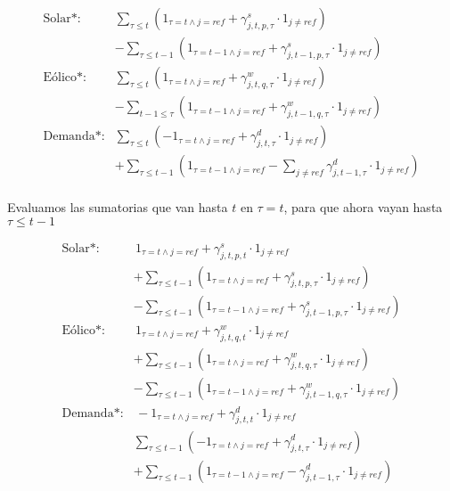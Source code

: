 \begin{align*}
    \text{Solar*:} & \sum_{\tau \leqslant  t} \left ( 1_{\tau = t \wedge j = ref} + \gamma^{s}_{j, t, p, \tau}\cdot 1_{j\neq{ref}} \right ) \\
    & - \sum_{\tau \leqslant  t-1} \left ( 1_{\tau = t-1 \wedge j = ref} + \gamma^{s}_{j, t-1, p, \tau}\cdot 1_{j\neq{ref}} \right ) \\
    \text{Eólico*:} & \sum_{\tau \leqslant  t} \left ( 1_{\tau = t \wedge j = ref} + \gamma^{w}_{j, t, q, \tau}\cdot 1_{j\neq{ref}} \right ) \\
    & - \sum_{t-1 \leqslant \tau} \left ( 1_{\tau = t-1 \wedge j = ref} + \gamma^{w}_{j, t-1, q, \tau}\cdot 1_{j\neq{ref}} \right )  \\
    \text{Demanda*:} &  \sum_{\tau \leqslant  t} \left (- 1_{\tau = t \wedge j = ref} + \gamma^{d}_{j, t,\tau}\cdot 1_{j\neq{ref}} \right ) \\
    & + \sum_{\tau \leqslant  t-1} \left ( 1_{\tau = t-1 \wedge j = ref} - \sum_{j\neq{ref}}\gamma^{d}_{j, t-1,\tau}\cdot 1_{j\neq{ref}} \right )  \\
\end{align*}

Evaluamos las sumatorias que van hasta $t$ en $\tau = t$, para que ahora vayan hasta $\tau \leqslant t-1$

\begin{align*}
    \text{Solar*:} & \, 1_{\tau = t \wedge j = ref} + \gamma^{s}_{j, t, p, t}\cdot 1_{j\neq{ref}} \\
    & + \sum_{\tau \leqslant  t-1} \left ( 1_{\tau = t \wedge j = ref} + \gamma^{s}_{j, t, p, \tau}\cdot 1_{j\neq{ref}} \right ) \\
    & - \sum_{\tau \leqslant  t-1} \left ( 1_{\tau = t-1 \wedge j = ref} + \gamma^{s}_{j, t-1, p, \tau}\cdot 1_{j\neq{ref}} \right ) \\
    \text{Eólico*:} & \, 1_{\tau = t \wedge j = ref} + \gamma^{w}_{j, t, q, t}\cdot 1_{j\neq{ref}} \\
    & + \sum_{\tau \leqslant  t-1} \left ( 1_{\tau = t \wedge j = ref} + \gamma^{w}_{j, t, q, \tau}\cdot 1_{j\neq{ref}} \right ) \\
    & - \sum_{\tau \leqslant t-1} \left ( 1_{\tau = t-1 \wedge j = ref} + \gamma^{w}_{j, t-1, q, \tau}\cdot 1_{j\neq{ref}} \right )  \\
    \text{Demanda*:} & \, - 1_{\tau = t \wedge j = ref} + \gamma^{d}_{j, t,t}\cdot 1_{j\neq{ref}} \\
    & \sum_{\tau \leqslant  t-1} \left (- 1_{\tau = t \wedge j = ref} + \gamma^{d}_{j, t,\tau}\cdot 1_{j\neq{ref}} \right ) \\
    & + \sum_{\tau \leqslant  t-1} \left ( 1_{\tau = t-1 \wedge j = ref} - \gamma^{d}_{j, t-1,\tau}\cdot 1_{j\neq{ref}} \right )  \\
\end{align*}

